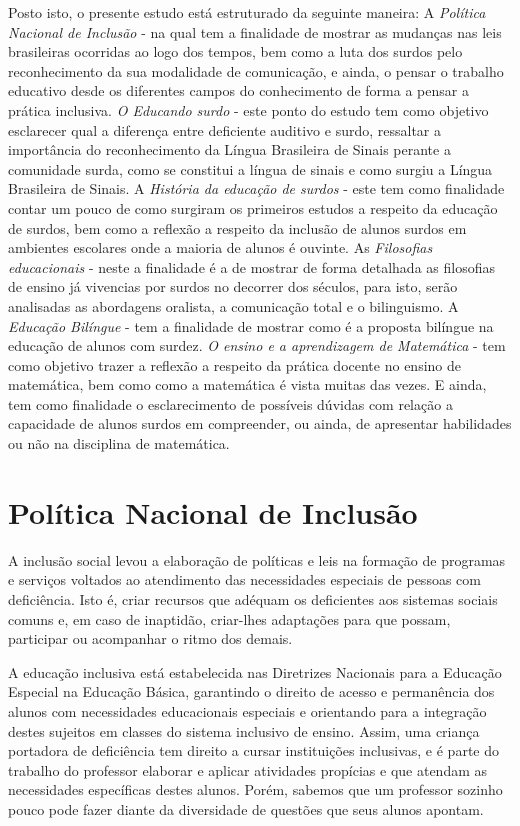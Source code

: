 \documentclass[brasil]{abnt}
\begin{document}
	Posto isto, o presente estudo está estruturado da seguinte maneira: A \textit{Política Nacional de Inclusão} - na qual tem a finalidade de mostrar as mudanças nas leis brasileiras ocorridas ao logo dos 
	tempos, bem como a luta dos surdos pelo reconhecimento da sua modalidade de comunicação, e ainda, o pensar o trabalho educativo desde os diferentes campos do conhecimento de forma a pensar a prática 
	inclusiva. \textit{O Educando surdo} - este ponto do estudo tem como objetivo esclarecer qual a diferença entre deficiente auditivo e surdo, ressaltar a importância do reconhecimento da Língua Brasileira de Sinais 
	perante a comunidade surda, como se constitui a língua de sinais e como surgiu a Língua Brasileira de Sinais. A \textit{História da educação de surdos} - este tem como finalidade contar um pouco 
	de como surgiram os primeiros estudos a respeito da educação de surdos, bem como a reflexão a respeito da inclusão de alunos surdos em ambientes escolares onde a maioria de alunos é ouvinte. As 
	\textit{Filosofias educacionais} - neste a finalidade é a de mostrar de forma detalhada as filosofias de ensino já vivencias por surdos no decorrer dos séculos, para isto, serão analisadas as abordagens oralista, 
	a comunicação total e o bilinguismo. A \textit{Educação Bilíngue} - tem a finalidade de mostrar como é a proposta bilíngue na educação de alunos com surdez. \textit{O ensino e a aprendizagem de Matemática} - tem como 
	objetivo trazer a reflexão a respeito da prática docente no ensino de matemática, bem como como a matemática é vista muitas das vezes. E ainda, tem como finalidade o esclarecimento de possíveis
	dúvidas com relação a capacidade de alunos surdos em compreender, ou ainda, de apresentar habilidades ou não na disciplina de matemática.  

\chapter{Política Nacional de Inclusão}
	A inclusão social levou a elaboração de políticas e leis na formação de programas e serviços voltados ao atendimento das necessidades especiais de pessoas com deficiência. Isto é, criar recursos que 
	adéquam os deficientes aos sistemas sociais comuns e, em caso de inaptidão, criar-lhes adaptações para que possam, participar ou acompanhar o ritmo dos demais. 
	
	A educação inclusiva está estabelecida nas Diretrizes Nacionais para a Educação Especial na Educação Básica, garantindo o direito de acesso e permanência dos alunos com necessidades 
	educacionais especiais e orientando para a integração destes sujeitos em classes do sistema inclusivo de ensino. Assim, uma criança portadora de deficiência tem direito a cursar instituições 
	inclusivas, e é parte do trabalho do professor elaborar e aplicar atividades propícias e que atendam as necessidades específicas destes alunos. Porém, sabemos que um professor sozinho pouco pode 
	fazer diante da diversidade de questões que seus alunos apontam. 
		
\end{document}
